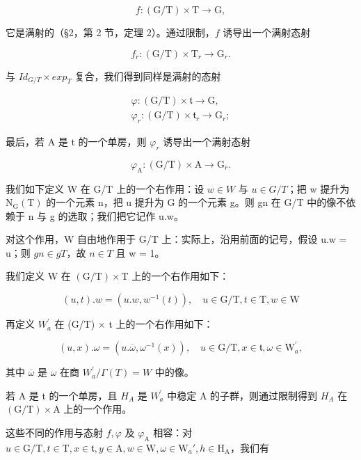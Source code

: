 \[
f: (\mathrm{G} / \mathrm{T}) \times \mathrm{T} \to \mathrm{G},
\]

它是满射的（§2，第 2 节，定理 2）。通过限制，\(f\) 诱导出一个满射态射

\[
f _ {r}: (\mathrm{G} / \mathrm{T}) \times \mathrm{T} _ {r} \rightarrow \mathrm{G} _ {r}.
\]

与 \(Id_{G/T} \times exp_{T}\) 复合，我们得到同样是满射的态射

\[
\begin{array}{c} \varphi : (\mathrm{G/T}) \times \mathfrak {t} \to \mathrm{G}, \\ \varphi_ {r}: (\mathrm{G/T}) \times \mathfrak {t} _ {r} \to \mathrm{G} _ {r}; \end{array}
\]

最后，若 A 是 t 的一个单房，则 \(\varphi_{r}\) 诱导出一个满射态射

\[
\varphi_ {\mathrm{A}}: (\mathrm{G/T}) \times \mathrm{A} \to \mathrm{G} _ {r}.
\]

我们如下定义 W 在 G/T 上的一个右作用：设 \(w \in W\) 与 \(u \in G/T\)；把 w 提升为 \(\mathrm{N}_{\mathrm{G}}(\mathrm{T})\) 的一个元素 n，把 u 提升为 G 的一个元素 g。则 gn 在 G/T 中的像不依赖于 n 与 g 的选取；我们把它记作 u.w。

对这个作用，W 自由地作用于 G/T 上：实际上，沿用前面的记号，假设 u.w = u；则 \(gn \in gT\)，故 \(n \in T\) 且 w = 1。

我们定义 W 在 \((\mathrm{G}/\mathrm{T}) \times \mathrm{T}\) 上的一个右作用如下：

\[
(u, t). w = (u. w, w ^ {- 1} (t)), \quad u \in \mathrm{G} / \mathrm{T}, t \in \mathrm{T}, w \in \mathrm{W}
\]

再定义 \(W_{a}^{\prime}\) 在 (G/T) × t 上的一个右作用如下：

\[
(u, x). \omega = (u. \overline {{\omega}}, \omega^ {- 1} (x)), \quad u \in \mathrm{G/T}, x \in \mathfrak {t}, \omega \in \mathrm{W} _ {a} ^ {\prime},
\]

其中 \(\overline{\omega}\) 是 \(\omega\) 在商 \(W_{a}^{\prime}/\Gamma(T)=W\) 中的像。

若 A 是 t 的一个单房，且 \(H_{A}\) 是 \(W_{a}^{\prime}\) 中稳定 A 的子群，则通过限制得到 \(H_{A}\) 在 \((\mathrm{G}/\mathrm{T}) \times \mathrm{A}\) 上的一个作用。

这些不同的作用与态射 \(f, \varphi\) 及 \(\varphi_{\mathrm{A}}\) 相容：对 \(u \in \mathrm{G} / \mathrm{T}, t \in \mathrm{T}, x \in \mathfrak{t}, y \in \mathrm{A}, w \in \mathrm{W}, \omega \in \mathrm{W}_a', h \in \mathrm{H}_{\mathrm{A}}\)，我们有

